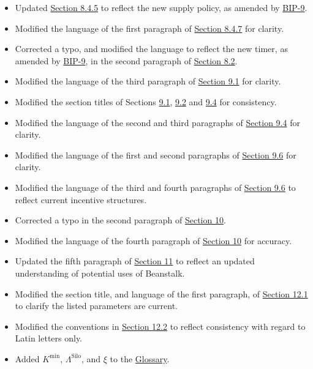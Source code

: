 \documentclass[class=article, crop=false]{standalone}
\begin{document}
\begin{itemize}[topsep=0pt, itemsep=3pt,leftmargin=16pt]
\begin{itemize}
        \item Updated \hyperlink{subsubsection.8.4.5}{Section 8.4.5} to reflect the new  supply policy, as amended by \href{https://github.com/BeanstalkFarms/Beanstalk-Governance-Proposals/blob/master/bip/bip-09-efficiency-improvements.md}{BIP-9}.
        \item Modified the language of the first paragraph of \hyperlink{subsubsection.8.4.7}{Section 8.4.7} for clarity.
        \item Corrected a typo, and modified the language to reflect the new  timer, as amended by \href{https://github.com/BeanstalkFarms/Beanstalk-Governance-Proposals/blob/master/bip/bip-09-efficiency-improvements.md}{BIP-9}, in the second paragraph of \hyperlink{subsection.8.2}{Section 8.2}.
        \item Modified the language of the third paragraph of \hyperlink{subsection.9.1}{Section 9.1} for clarity.
        \item Modified the section titles of Sections \hyperlink{subsection.9.1}{9.1}, \hyperlink{subsection.9.2}{9.2} and \hyperlink{subsection.9.4}{9.4} for consistency.
        \item Modified the language of the second and third paragraphs of \hyperlink{subsection.9.4}{Section 9.4} for clarity.
        \item Modified the language of the first and second paragraphs of \hyperlink{subsection.9.6}{Section 9.6} for clarity.
        \item Modified the language of the third and fourth paragraphs of \hyperlink{subsection.9.6}{Section 9.6} to reflect current incentive structures.
        \item Corrected a typo in the second paragraph of \hyperlink{section.10}{Section 10}.
        \item Modified the language of the fourth paragraph of \hyperlink{section.10}{Section 10} for accuracy.
        \item Updated the fifth paragraph of \hyperlink{section.11}{Section 11} to reflect an updated understanding of potential uses of Beanstalk. 
        \item Modified the section title, and language of the first paragraph, of \hyperlink{subsection.12.1}{Section 12.1} to clarify the listed parameters are current.
        \item Modified the conventions in \hyperlink{subsection.12.2}{Section 12.2} to reflect consistency with regard to Latin letters only.
        \item Added $K^{\text{min}}$, $\Lambda^{\text{Silo}}$, and $\xi$ to the \hyperlink{subsection.14.11}{Glossary}. 

\end{itemize}
\end{itemize}
\end{document}
